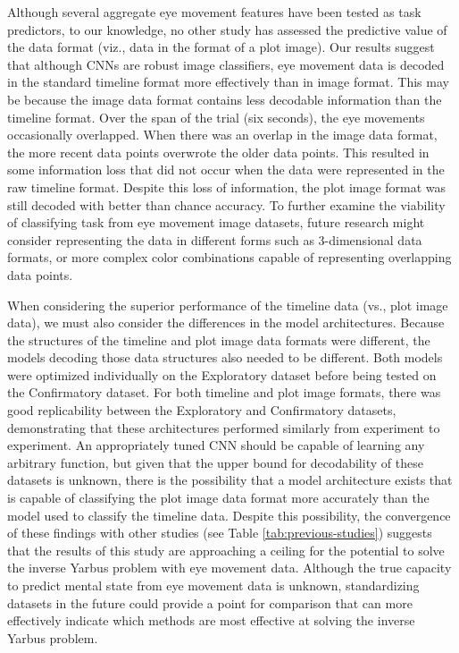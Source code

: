 \documentclass[
  english,
  man,floatsintext]{apa6}
\begin{document}
Although several aggregate eye movement features have been tested as task predictors, to our knowledge, no other study has assessed the predictive value of the data format (viz., data in the format of a plot image). Our results suggest that although CNNs are robust image classifiers, eye movement data is decoded in the standard timeline format more effectively than in image format. This may be because the image data format contains less decodable information than the timeline format. Over the span of the trial (six seconds), the eye movements occasionally overlapped. When there was an overlap in the image data format, the more recent data points overwrote the older data points. This resulted in some information loss that did not occur when the data were represented in the raw timeline format. Despite this loss of information, the plot image format was still decoded with better than chance accuracy. To further examine the viability of classifying task from eye movement image datasets, future research might consider representing the data in different forms such as 3-dimensional data formats, or more complex color combinations capable of representing overlapping data points.

When considering the superior performance of the timeline data (vs., plot image data), we must also consider the differences in the model architectures. Because the structures of the timeline and plot image data formats were different, the models decoding those data structures also needed to be different. Both models were optimized individually on the Exploratory dataset before being tested on the Confirmatory dataset. For both timeline and plot image formats, there was good replicability between the Exploratory and Confirmatory datasets, demonstrating that these architectures performed similarly from experiment to experiment. An appropriately tuned CNN should be capable of learning any arbitrary function, but given that the upper bound for decodability of these datasets is unknown, there is the possibility that a model architecture exists that is capable of classifying the plot image data format more accurately than the model used to classify the timeline data. Despite this possibility, the convergence of these findings with other studies (see Table \ref{tab:previous-studies}) suggests that the results of this study are approaching a ceiling for the potential to solve the inverse Yarbus problem with eye movement data. Although the true capacity to predict mental state from eye movement data is unknown, standardizing datasets in the future could provide a point for comparison that can more effectively indicate which methods are most effective at solving the inverse Yarbus problem.
\end{document}
